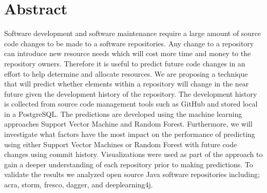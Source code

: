 \chapter*{Abstract}

Software development and software maintenance require a large amount of source code changes to be made to a software repositories. Any change to a repository can introduce new resource needs which will cost more time and money to the repository owners. Therefore it is useful to predict future code changes in an effort to help determine and allocate resources. We are proposing a technique that will predict whether elements within a repository will change in the near future given the development history of the repository. The development history is collected from source code management tools such as GitHub and stored local in a PostgreSQL. The predictions are developed using the machine learning approaches Support Vector Machine and Random Forest. Furthermore, we will investigate what factors have the most impact on the performance of predicting using either Support Vector Machines or Random Forest with future code changes using commit history. Visualizations were used as part of the approach to gain a deeper understanding of each repository prior to making predictions. To validate the results we analyzed open source Java software repositories including; acra, storm, fresco, dagger, and deeplearning4j.

